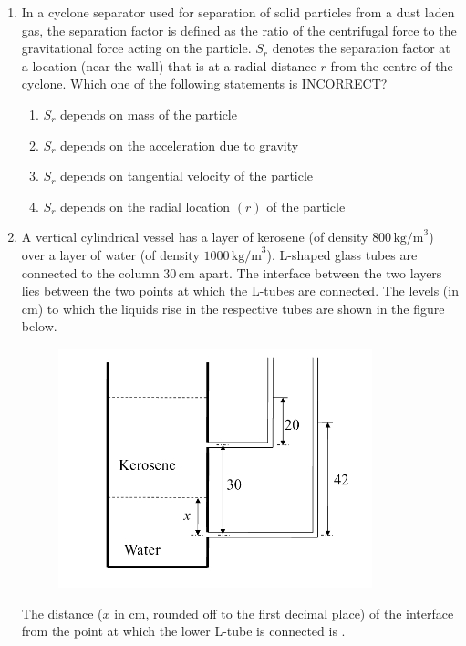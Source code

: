 \documentclass[journal,12pt,onecolumn]{IEEEtran}
\theoremstyle{remark}
\begin{document}
\begin{enumerate}
        \item In a cyclone separator used for separation of solid particles from a dust laden gas, the separation factor is defined as the ratio of the centrifugal force to the gravitational force acting on the particle. $S_r$ denotes the separation factor at a location (near the wall) that is at a radial distance $r$ from the centre of the cyclone. Which one of the following statements is INCORRECT?
        \hfill{}
        \begin{enumerate}
            \item $S_r$ depends on mass of the particle
            \item $S_r$ depends on the acceleration due to gravity
            \item $S_r$ depends on tangential velocity of the particle
            \item $S_r$ depends on the radial location $(r)$ of the particle
        \end{enumerate}

    \item A vertical cylindrical vessel has a layer of kerosene (of density $800 \, \text{kg/m}^3$) over a layer of water (of density $1000 \, \text{kg/m}^3$). L-shaped glass tubes are connected to the column $30 \, \text{cm}$ apart. The interface between the two layers lies between the two points at which the L-tubes are connected. The levels (in cm) to which the liquids rise in the respective tubes are shown in the figure below.

\begin{figure}[H]
    \centering
    \includegraphics[width=0.5\columnwidth]{figs/qn 8.jpg}
    \caption{}
    \label{fig:qn 18.jpg}
\end{figure}
The distance ($x$ in cm, rounded off to the first decimal place) of the interface from the point at which the lower L-tube is connected is \underline{\hspace{1cm}}.\hfill{}


\end{enumerate}
\end{document}

